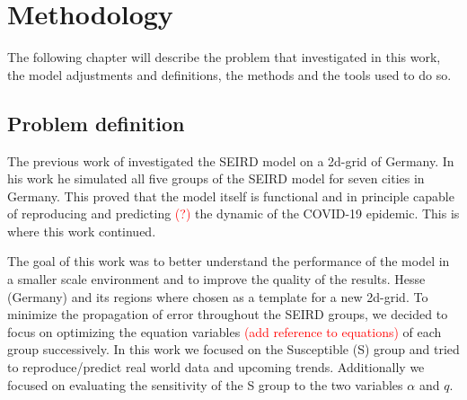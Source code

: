 
\chapter{Methodology} %
The following chapter will describe the problem that investigated in this work, the model adjustments and definitions,
the methods and the tools used to do so.

\label{chap:methodology} %


\section{Problem definition}
\label{sec:problemDef}

The previous work of \cite{Rastogi} investigated the SEIRD model on a 2d-grid of Germany. In his work he simulated
all five groups of the SEIRD model for seven cities in Germany. This proved that the model itself is functional and
in principle capable of reproducing and predicting \textcolor{red}{(?)} the dynamic of the COVID-19 epidemic. This %
is where this work continued.\newline

\par
The goal of this work was to better understand the performance of the model in a smaller scale environment and to improve
the quality of the results. Hesse (Germany) and its regions where chosen as a template for a new 2d-grid. To minimize the
propagation of error throughout the SEIRD groups, we decided to focus on optimizing the equation variables
\textcolor{red}{(add reference to equations)} %
of each group successively. In this work we focused on the Susceptible (S) group and tried to reproduce/predict real world
data and upcoming trends. Additionally we focused on evaluating the sensitivity of the S group to the two variables
$\alpha$ and $q$.

